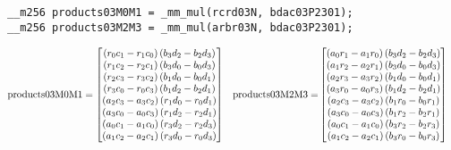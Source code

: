 \begin{verbatim}
__m256 products03M0M1 = _mm_mul(rcrd03N, bdac03P2301);
__m256 products03M2M3 = _mm_mul(arbr03N, bdac03P2301);
\end{verbatim} 
\begin{align*}
\mathrm{products03M0M1} 
=
\begin{bmatrix}
\left(r_0c_1 - r_1c_0\right)\left(b_3d_2 - b_2d_3\right)\\
\left(r_1c_2 - r_2c_1\right)\left(b_3d_0 - b_0d_3\right)\\
\left(r_2c_3 - r_3c_2\right)\left(b_1d_0 - b_0d_1\right)\\
\left(r_3c_0 - r_0c_3\right)\left(b_1d_2 - b_2d_1\right)\\
\left(a_2c_3 - a_3c_2\right)\left(r_1d_0 - r_0d_1\right)\\
\left(a_3c_0 - a_0c_3\right)\left(r_1d_2 - r_2d_1\right)\\
\left(a_0c_1 - a_1c_0\right)\left(r_3d_2 - r_2d_3\right)\\
\left(a_1c_2 - a_2c_1\right)\left(r_3d_0 - r_0d_3\right)\\
\end{bmatrix}
&&
\mathrm{products03M2M3} 
=&
\begin{bmatrix}
\left(a_0r_1 - a_1r_0\right)\left(b_3d_2 - b_2d_3\right)\\
\left(a_1r_2 - a_2r_1\right)\left(b_3d_0 - b_0d_3\right)\\
\left(a_2r_3 - a_3r_2\right)\left(b_1d_0 - b_0d_1\right)\\
\left(a_3r_0 - a_0r_3\right)\left(b_1d_2 - b_2d_1\right)\\
\left(a_2c_3 - a_3c_2\right)\left(b_1r_0 - b_0r_1\right)\\
\left(a_3c_0 - a_0c_3\right)\left(b_1r_2 - b_2r_1\right)\\
\left(a_0c_1 - a_1c_0\right)\left(b_3r_2 - b_2r_3\right)\\
\left(a_1c_2 - a_2c_1\right)\left(b_3r_0 - b_0r_3\right)\\
\end{bmatrix}
\end{align*}

